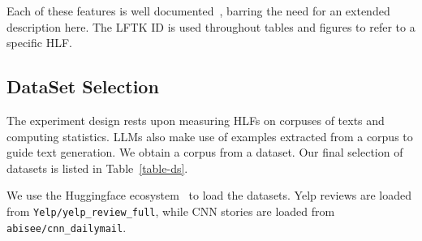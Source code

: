 \documentclass[11pt]{article}
\begin{document}
Each of these features is well documented~\cite{lftk-2023}, barring the need for
an extended description here.
The LFTK ID is used throughout tables and figures to refer to a specific HLF.

\subsection{DataSet Selection}\label{ds-selection}

The experiment design rests upon measuring HLFs on corpuses of texts and
computing statistics.
LLMs also make use of examples extracted from a corpus to guide text generation.
We obtain a corpus from a dataset.
Our final selection of datasets is listed in Table~\ref{table-ds}.

\begin{table}[ht]
    \setlength\tabcolsep{6pt}
    \centering
    \caption{Source Datasets}\label{table-ds}
\end{table}

We use the Huggingface ecosystem~\cite{lhoest-etal-2021-datasets} to load the
datasets.
Yelp reviews are loaded from \texttt{Yelp/yelp\_review\_full}, while CNN stories
are loaded from \texttt{abisee/cnn\_dailymail}.
\end{document}
